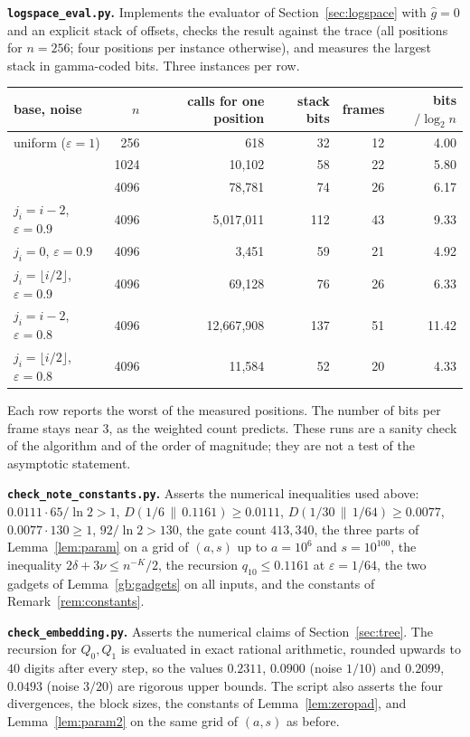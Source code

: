 \documentclass[11pt]{amsart}
\theoremstyle{definition}
\theoremstyle{remark}
\newcommand{\eps}{\varepsilon}
\newcommand{\ghat}{\hat g}
\begin{document}
\medskip\noindent\textbf{\texttt{logspace\_eval.py}.} Implements the evaluator of
Section~\ref{sec:logspace} with $\ghat=0$ and an explicit stack of offsets, checks the result
against the trace (all positions for $n=256$; four positions per instance otherwise), and measures
the largest stack in gamma-coded bits. Three instances per row.

\begin{center}
\begin{tabular}{lrrrrr}
\toprule
base, noise & $n$ & calls for one position & stack bits & frames & bits$/\log_2n$\\
\midrule
uniform ($\eps=1$) & 256 & 618 & 32 & 12 & 4.00\\
 & 1024 & 10{,}102 & 58 & 22 & 5.80\\
 & 4096 & 78{,}781 & 74 & 26 & 6.17\\
$j_i=i-2$, $\eps=0.9$ & 4096 & 5{,}017{,}011 & 112 & 43 & 9.33\\
$j_i=0$, $\eps=0.9$ & 4096 & 3{,}451 & 59 & 21 & 4.92\\
$j_i=\lfloor i/2\rfloor$, $\eps=0.9$ & 4096 & 69{,}128 & 76 & 26 & 6.33\\
$j_i=i-2$, $\eps=0.8$ & 4096 & 12{,}667{,}908 & 137 & 51 & 11.42\\
$j_i=\lfloor i/2\rfloor$, $\eps=0.8$ & 4096 & 11{,}584 & 52 & 20 & 4.33\\
\bottomrule
\end{tabular}
\end{center}

\noindent Each row reports the worst of the measured positions. The number of bits per frame stays
near $3$, as the weighted count predicts. These runs are a sanity check of the algorithm and of
the order of magnitude; they are not a test of the asymptotic statement.

\medskip\noindent\textbf{\texttt{check\_note\_constants.py}.} Asserts the numerical inequalities
used above: $0.0111\cdot65/\ln2>1$, $D(1/6\,\|\,0.1161)\ge0.0111$, $D(1/30\,\|\,1/64)\ge0.0077$,
$0.0077\cdot130\ge1$, $92/\ln2>130$, the gate count $413{,}340$, the three parts of
Lemma~\ref{lem:param} on a grid of $(a,s)$ up to $a=10^6$ and $s=10^{100}$, the inequality
$2\delta+3\nu\le n^{-K}/2$, the recursion $q_{10}\le0.1161$ at $\eps=1/64$, the two gadgets of
Lemma~\ref{gb:gadgets} on all inputs, and the constants of Remark~\ref{rem:constants}.

\medskip\noindent\textbf{\texttt{check\_embedding.py}.} Asserts the numerical claims of
Section~\ref{sec:tree}. The recursion for $Q_0,Q_1$ is evaluated in exact rational arithmetic,
rounded upwards to $40$ digits after every step, so the values $0.2311$, $0.0900$ (noise $1/10$)
and $0.2099$, $0.0493$ (noise $3/20$) are rigorous upper bounds. The script also asserts the four
divergences, the block sizes, the constants of Lemma~\ref{lem:zeropad}, and
Lemma~\ref{lem:param2} on the same grid of $(a,s)$ as before.
\end{document}
